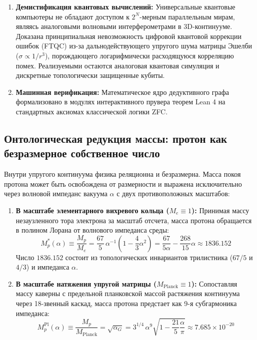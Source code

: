 \documentclass[11pt,a4paper]{article}
\theoremstyle{definition}
\theoremstyle{remark}
\begin{document}
\begin{enumerate}
\begin{itemize}
\end{itemize}
\item \textbf{Демистификация квантовых вычислений:} Универсальные квантовые компьютеры не обладают доступом к $2^N$-мерным параллельным мирам, являясь аналоговыми волновыми интерферометрами в 3D-континууме. Доказана принципиальная невозможность цифровой квантовой коррекции ошибок (FTQC) из-за дальнодействующего упругого шума матрицы Эшелби ($\sigma \propto 1/r^3$), порождающего логарифмически расходящуюся корреляцию помех. Реализуемыми остаются аналоговая квантовая симуляция и дискретные топологически защищенные кубиты.
\item \textbf{Машинная верификация:} Математическое ядро дедуктивного графа формализовано в модулях интерактивного прувера теорем Lean 4 на стандартных аксиомах классической логики ZFC.
\end{enumerate}

\subsection*{Онтологическая редукция массы: протон как безразмерное собственное число}

Внутри упругого континуума физика реляционна и безразмерна. Масса покоя протона может быть освобождена от размерности и выражена исключительно через волновой импеданс вакуума $\alpha$ с двух противоположных масштабов:

\begin{enumerate}
\item \textbf{В масштабе элементарного вихревого кольца ($M_e \equiv 1$):}
Принимая массу незаузленного тора электрона за масштаб отсчета, масса протона обращается в полином Лорана от волнового импеданса среды:
\begin{equation}
M_p^*(\alpha) \equiv \frac{M_p}{M_e} = \frac{67}{5} \, \alpha^{-1} \left( 1 - \frac{4}{3}\alpha^2 \right) = \frac{67}{5\alpha} - \frac{268}{15}\alpha \approx 1836.152
\label{eq:proton_mass_dimensionless_electron}
\end{equation}
Число $1836.152$ состоит из топологических инвариантов трилистника ($67/5$ и $4/3$) и импеданса $\alpha$.

\item \textbf{В масштабе натяжения упругой матрицы ($M_{\mathrm{Planck}} \equiv 1$):}
Сопоставляя массу каверны с предельной планковской массой растяжения континуума через 18-звенный каскад, масса протона предстает как 9-я субгармоника импеданса:
\begin{equation}
M_p^{\mathrm{Pl}}(\alpha) \equiv \frac{M_p}{M_{\mathrm{Planck}}} = \sqrt{\alpha_G} = 3^{1/4} \, \alpha^9 \sqrt{1 - \frac{21}{5}\frac{\alpha}{\pi}} \approx 7.685 \times 10^{-20}
\label{eq:proton_mass_dimensionless_planck}
\end{equation}
\end{enumerate}
\end{document}
